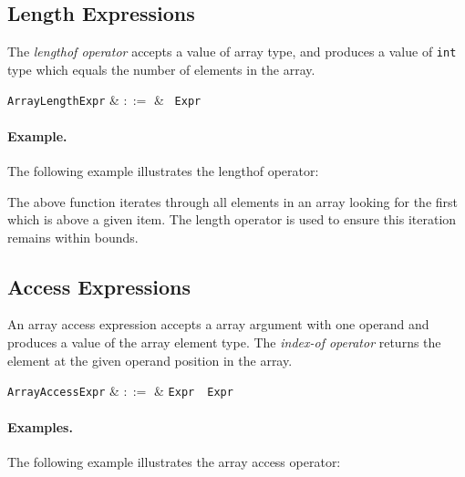 
\subsection{Length Expressions}
\label{c_expr_length}

The {\em lengthof operator} accepts a value of array type, and produces a value of \lstinline{int} type which equals the number of elements in the array.

\begin{syntax}
\verb+ArrayLengthExpr+ & $::=$ & \token{|}\ \verb+Expr+\ \token{|}\\
\end{syntax}

\paragraph{Example.} The following example illustrates the lengthof operator:



The above function iterates through all elements in an array looking for the first which is above a given item.  The length operator is used to ensure this iteration remains within bounds.


\subsection{Access Expressions}
\label{c_expr_array_access}

An array access expression accepts a array argument with one operand and produces a value of the array element type.  The {\em index-of operator} returns the element at the given operand position in the array.  

\begin{syntax}
  \verb+ArrayAccessExpr+ & $::=$ & \verb+Expr+\ \token{[}\ \verb+Expr+\ \token{]}\\
\end{syntax}

\paragraph{Examples.} The following example illustrates the array access operator:

